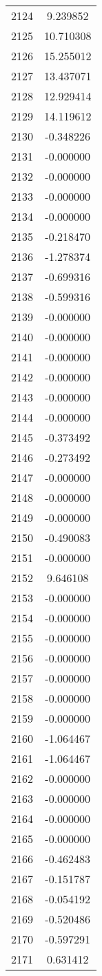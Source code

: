 \documentclass[12pt]{article}
\begin{document}
\begin{longtable}{@{}cc@{}}
2124 & 9.239852 \\
2125 & 10.710308 \\
2126 & 15.255012 \\
2127 & 13.437071 \\
2128 & 12.929414 \\
2129 & 14.119612 \\
2130 & -0.348226 \\
2131 & -0.000000 \\
2132 & -0.000000 \\
2133 & -0.000000 \\
2134 & -0.000000 \\
2135 & -0.218470 \\
2136 & -1.278374 \\
2137 & -0.699316 \\
2138 & -0.599316 \\
2139 & -0.000000 \\
2140 & -0.000000 \\
2141 & -0.000000 \\
2142 & -0.000000 \\
2143 & -0.000000 \\
2144 & -0.000000 \\
2145 & -0.373492 \\
2146 & -0.273492 \\
2147 & -0.000000 \\
2148 & -0.000000 \\
2149 & -0.000000 \\
2150 & -0.490083 \\
2151 & -0.000000 \\
2152 & 9.646108 \\
2153 & -0.000000 \\
2154 & -0.000000 \\
2155 & -0.000000 \\
2156 & -0.000000 \\
2157 & -0.000000 \\
2158 & -0.000000 \\
2159 & -0.000000 \\
2160 & -1.064467 \\
2161 & -1.064467 \\
2162 & -0.000000 \\
2163 & -0.000000 \\
2164 & -0.000000 \\
2165 & -0.000000 \\
2166 & -0.462483 \\
2167 & -0.151787 \\
2168 & -0.054192 \\
2169 & -0.520486 \\
2170 & -0.597291 \\
2171 & 0.631412 \\

\end{longtable}
\end{document}
